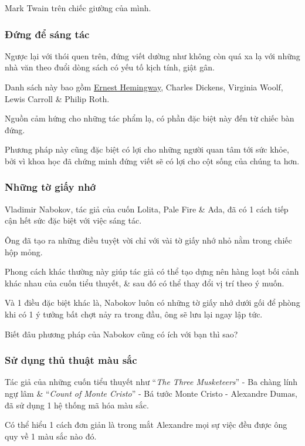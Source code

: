 \documentclass{article}
\begin{document}
%
\textsf{Mark Twain trên chiếc giường của mình.}

\subsubsection{Đứng để sáng tác}
Ngược lại với thói quen trên, đứng viết dường như không còn quá xa lạ với những nhà văn theo đuổi dòng sách có yếu tố kịch tính, giật gân.

Danh sách này bao gồm \href{http://tramdoc.vn/tin-tuc/25-cuon-sach-ma-nguoi-dan-ong-nao-cung-nen-doc-it-nhat-mot-lan-trong-doi-nZN4aW.html}{Ernest Hemingway}, Charles Dickens, Virginia Woolf, Lewis Carroll \& Philip Roth.

Nguồn cảm hứng cho những tác phẩm lạ, có phần đặc biệt này đến từ chiếc bàn đứng.

Phương pháp này cũng đặc biệt có lợi cho những người quan tâm tới sức khỏe, bởi vì khoa học đã chứng minh đứng viết sẽ có lợi cho cột sống của chúng ta hơn.

\subsubsection{Những tờ giấy nhớ}
Vladimir Nabokov, tác giả của cuốn Lolita, Pale Fire \& Ada, đã có 1 cách tiếp cận hết sức đặc biệt với việc sáng tác.

Ông đã tạo ra những điều tuyệt vời chỉ với vài tờ giấy nhớ nhỏ nằm trong chiếc hộp mỏng.

Phong cách khác thường này giúp tác giả có thể tạo dựng nên hàng loạt bối cảnh khác nhau của cuốn tiểu thuyết, \& sau đó có thể thay đổi vị trí theo ý muốn.

Và  1 điều đặc biệt khác là, Nabokov luôn có những tờ giấy nhớ dưới gối để phòng khi có 1 ý tưởng bất chợt nảy ra trong đầu, ông sẽ lưu lại ngay lập tức. 

Biết đâu phương pháp của Nabokov cũng có ích với bạn thì sao?

\subsubsection{Sử dụng thủ thuật màu sắc}
Tác giả của những cuốn tiểu thuyết như  ``\textit{The Three Musketeers}'' - Ba chàng lính ngự lâm \& ``\textit{Count of Monte Cristo}'' - Bá tước Monte Cristo - Alexandre Dumas, đã sử dụng 1 hệ thống mã hóa màu sắc.

Có thể hiểu 1 cách đơn giản là trong mắt Alexandre mọi sự việc đều được ông quy về 1 màu sắc nào đó.
\end{document}
